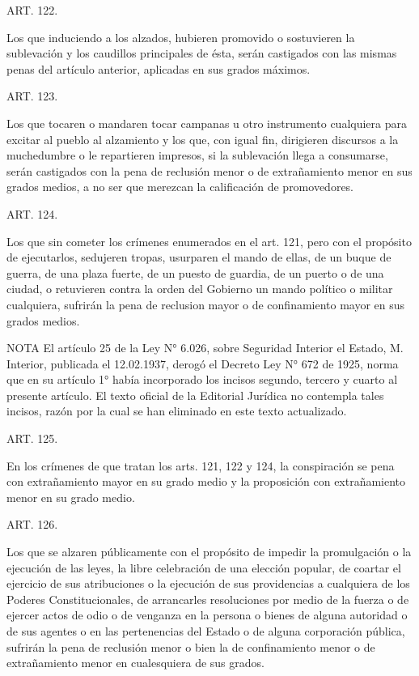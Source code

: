     ART. 122.

    Los que induciendo a los alzados, hubieren promovido o sostuvieren la sublevación y los caudillos principales de ésta, serán castigados con las mismas penas del artículo anterior, aplicadas en sus grados máximos.


    ART. 123.

    Los que tocaren o mandaren tocar campanas u otro instrumento cualquiera para excitar al pueblo al alzamiento y los que, con igual fin, dirigieren discursos a la muchedumbre o le repartieren impresos, si la sublevación llega a consumarse, serán castigados con la pena de reclusión menor o de extrañamiento menor en sus grados medios, a no ser que merezcan la calificación de promovedores.


    ART. 124.

    Los que sin cometer los crímenes enumerados en el art. 121, pero con el propósito de ejecutarlos, sedujeren tropas, usurparen el mando de ellas, de un buque de guerra, de una plaza fuerte, de un puesto de guardia, de un puerto o de una ciudad, o retuvieren contra la orden del Gobierno un mando político o militar cualquiera, sufrirán la pena de reclusion mayor o de confinamiento mayor en sus grados medios.



NOTA
      El artículo 25 de la Ley N° 6.026, sobre Seguridad Interior el Estado, M. Interior, publicada el 12.02.1937, derogó el Decreto Ley N° 672 de 1925, norma que en su artículo 1° había incorporado los incisos segundo, tercero y cuarto al presente artículo. El texto oficial de la Editorial Jurídica no contempla tales incisos, razón por la cual se han eliminado en este texto actualizado.

    ART. 125.

    En los crímenes de que tratan los arts. 121, 122 y 124, la conspiración se pena con extrañamiento mayor en su grado medio y la proposición con extrañamiento menor en su grado medio.


    ART. 126.

    Los que se alzaren públicamente con el propósito de impedir la promulgación o la ejecución de las leyes, la libre celebración de una elección popular, de coartar el ejercicio de sus atribuciones o la ejecución de sus providencias a cualquiera de los Poderes Constitucionales, de arrancarles resoluciones por medio de la fuerza o de ejercer actos de odio o de venganza en la persona o bienes de alguna autoridad o de sus agentes o en las pertenencias del Estado o de alguna corporación pública, sufrirán la pena de reclusión menor o bien la de confinamiento menor o de extrañamiento menor en cualesquiera de sus grados.


